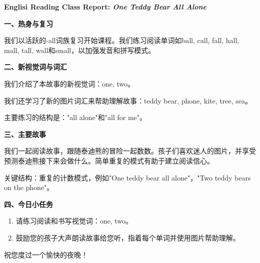 \documentclass[a4paper, 14pt]{article}
\begin{document}
\begin{englishbox}
\par
\textbf{Englisi Reading Class Report: \textit{One Teddy Bear All Alone}}

\textbf{一、热身与复习}

我们以活跃的-all词族复习开始课程。我们练习阅读单词如ball, call, fall, hall, mall, tall, wall和small，以加强发音和拼写模式。

\textbf{二、新视觉词与词汇}

我们介绍了本故事的新视觉词：one, two。

我们还学习了新的图片词汇来帮助理解故事：teddy bear, phone, kite, tree, sea。

主要练习的结构是："all alone"和"all for me"。

\textbf{三、主要故事}

我们一起阅读故事，跟随泰迪熊的冒险一起数数。孩子们喜欢迷人的图片，并享受预测泰迪熊接下来会做什么。简单重复的模式有助于建立阅读信心。

关键结构：重复的计数模式，例如"One teddy bear all alone"，"Two teddy bears on the phone"。

\textbf{四、今日小任务}

\begin{enumerate}
\item 请练习阅读和书写视觉词：one, two。
\item 鼓励您的孩子大声朗读故事给您听，指着每个单词并使用图片帮助理解。
\end{enumerate}

祝您度过一个愉快的夜晚！

\end{englishbox}

\end{document}
